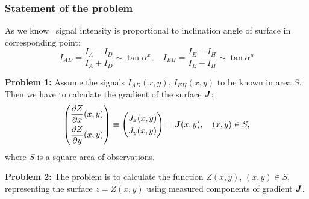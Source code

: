 \documentclass{beamer}
\begin{document}
\begin{frame}[c,allowframebreaks]
    \frametitle{Statement of the problem}
    As we know~\cite{PaluszynskiSlowko2005Vacuum, DrzazgaPaluszynski2005Measurement} signal
    intensity is proportional to inclination angle of surface in corresponding point:
    $$ I_{AD} = \frac{I_A - I_D}{I_A + I_D} \sim \tan{\alpha^x}, \quad I_{EH} =
    \frac{I_E - I_H}{I_E + I_H} \sim \tan{\alpha^y} $$


    \textbf{Problem 1:} Assume the signals $I_{AD}(x,y)$, $I_{EH}(x,y)$ to be known in area $S$.
    Then we have to calculate the gradient of the surface ${\textbf{\emph{J}}}$:
    \begin{equation}
        \label{problem_statement}
        \left(
        \begin{aligned}
            &\frac{\partial Z}{\partial x} (x,y)\\
            &\frac{\partial Z}{\partial y} (x,y)
        \end{aligned}
        \right)
        \equiv
        \left(
        \begin{aligned}
            &J_x (x,y)\\
            &J_y (x,y)
        \end{aligned}
        \right)
        = {\textbf{\emph{J}}}(x,y)
        , \quad (x,y) \in S,
    \end{equation}
    where $S$ is a square area of observations.

    \vfill

    \textbf{Problem 2:}
    The problem is to calculate the function $Z(x,y)$, $(x,y) \in S$,
    representing the surface $z = Z(x,y)$ using measured components of gradient ${\textbf{\emph{J}}}$.

\end{frame}
\end{document}
